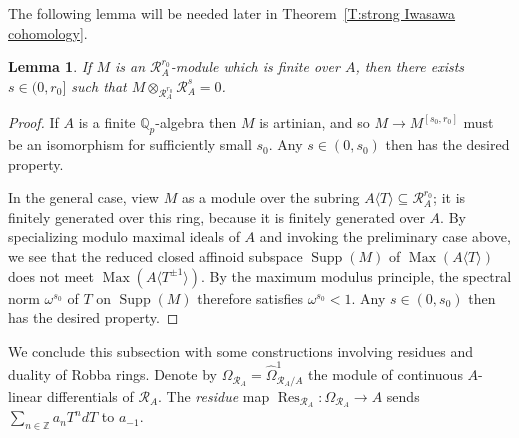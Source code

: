 \documentclass[12pt]{article}
\newtheorem{lemma}[theorem]{Lemma}
\theoremstyle{definition}
\numberwithin{equation}{theorem}
\newcommand{\calR}{\mathcal{R}}
\newcommand{\QQ}{\mathbb{Q}}
\newcommand{\ZZ}{\mathbb{Z}}
\def\Qp{\QQ_p}
\DeclareMathOperator{\Max}{Max}
\DeclareMathOperator{\Res}{Res}
\DeclareMathOperator{\Supp}{Supp}
\begin{document}
The following lemma will be needed later in Theorem~\ref{T:strong Iwasawa cohomology}.


\begin{lemma}
\label{L:finite A-mod as R_A-mod}
If $M$ is an $\calR_A^{r_0}$-module which is finite over $A$, then there exists $s \in (0, r_0]$ such that $M \otimes_{\calR_A^{r_0}} \calR_A^s = 0$.
\end{lemma}
\begin{proof}
If $A$ is a finite $\Qp$-algebra then $M$ is artinian, and so $M \to
M^{[s_0,r_0]}$ must be an isomorphism for sufficiently small $s_0$.
Any $s \in (0,s_0)$ then has the desired property.

In the general case, view $M$ as a module over the subring $A\langle
T\rangle \subseteq \calR_A^{r_0}$; it is finitely generated over this
ring, because it is finitely generated over $A$.  By specializing
modulo maximal ideals of $A$ and invoking the preliminary case above,
we see that the reduced closed affinoid subspace $\Supp(M)$ of
$\Max(A\langle T\rangle)$ does not meet $\Max(A\langle
T^{\pm1}\rangle)$.  By the maximum modulus principle, the spectral
norm $\omega^{s_0}$ of $T$ on $\Supp(M)$ therefore satisfies
$\omega^{s_0} < 1$.  Any $s \in (0,s_0)$ then has the desired
property.
\end{proof}

We conclude this subsection with some constructions involving residues
and duality of Robba rings.  Denote by $\Omega_{\calR_A} =
\widehat{\Omega}^1_{\calR_A/A}$ the module of continuous $A$-linear
differentials of $\calR_A$.  The \emph{residue} map $\Res_{\calR_A}:
\Omega_{\calR_A} \to A$ sends $\sum_{n \in \ZZ} a_nT^ndT$ to $a_{-1}$.
\end{document}
